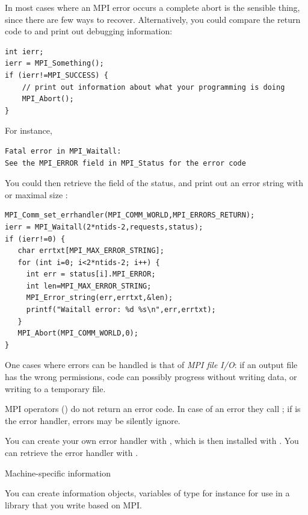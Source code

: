 In most cases where an MPI error occurs a complete abort is the
sensible thing, since there are few ways to recover.
Alternatively, you could compare the return code to 
and  print out debugging information:
\begin{lstlisting}
int ierr;
ierr = MPI_Something();
if (ierr!=MPI_SUCCESS) {
    // print out information about what your programming is doing
    MPI_Abort();
}
\end{lstlisting}
For instance,
\begin{verbatim}
Fatal error in MPI_Waitall: 
See the MPI_ERROR field in MPI_Status for the error code
\end{verbatim}
You could then retrieve the  field of the
status, and print out an error string with
or maximal size :
\begin{lstlisting}
MPI_Comm_set_errhandler(MPI_COMM_WORLD,MPI_ERRORS_RETURN);
ierr = MPI_Waitall(2*ntids-2,requests,status);
if (ierr!=0) {
   char errtxt[MPI_MAX_ERROR_STRING];
   for (int i=0; i<2*ntids-2; i++) {
     int err = status[i].MPI_ERROR;
     int len=MPI_MAX_ERROR_STRING;
     MPI_Error_string(err,errtxt,&len);
     printf("Waitall error: %d %s\n",err,errtxt);
   }
   MPI_Abort(MPI_COMM_WORLD,0);
}
\end{lstlisting}
One cases where errors can be handled is that of \emph{MPI file
  I/O}: if an output file has the wrong
permissions, code can possibly progress without writing data, or
writing to a temporary file.

MPI operators () do not return an error code. In case of
an error they call ; if 
is the error handler, errors may be silently ignore.

You can create your own error handler with
, which is then installed with
. You can retrieve the error
handler with .

 {Machine-specific information}
\label{sec:mpi-info}

You can create information objects, variables of type
for instance for use in a library
that you write based on MPI.


